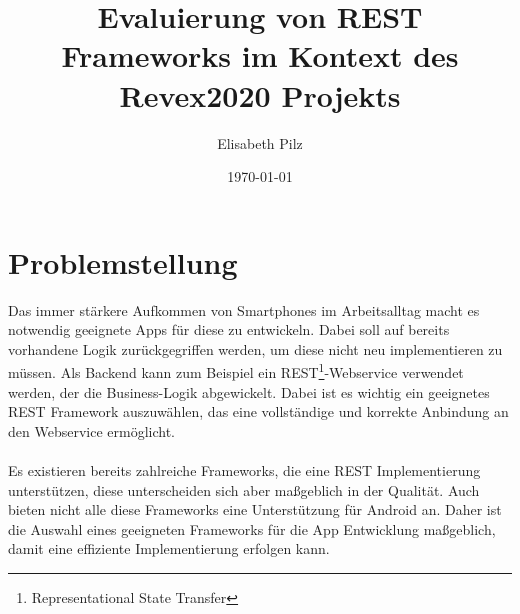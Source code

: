 \documentclass[a4paper,11pt,german,public]{INSOexpose}
\title{\centering Evaluierung von REST Frameworks im Kontext des Revex2020 Projekts\\}
\author{Elisabeth Pilz}
\date{\today}
\begin{document}
\maketitle
{}
\section{Problemstellung}

Das immer stärkere Aufkommen von Smartphones im Arbeitsalltag macht es notwendig geeignete Apps für diese zu entwickeln. Dabei soll auf bereits vorhandene Logik zurückgegriffen werden, um diese nicht neu implementieren zu müssen. Als Backend kann zum Beispiel ein REST\footnote{Representational State Transfer}-Webservice verwendet werden, der die Business-Logik abgewickelt. Dabei ist es wichtig ein geeignetes REST Framework auszuwählen, das eine vollständige und korrekte Anbindung an den Webservice ermöglicht.   
\\\\
Es existieren bereits zahlreiche Frameworks, die eine REST Implementierung unterstützen, diese unterscheiden sich aber maßgeblich in der Qualität. Auch bieten nicht alle diese Frameworks eine Unterstützung für Android an. Daher ist die Auswahl eines geeigneten Frameworks für die App Entwicklung maßgeblich, damit eine effiziente Implementierung erfolgen kann. 


\end{document}
